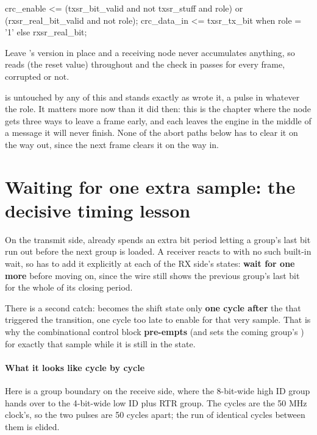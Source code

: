 \begin{vhdlcode}
crc_enable  <= (txsr_bit_valid and not txsr_stuff and role) or
               (rxsr_real_bit_valid and not role);
crc_data_in <= txsr_tx_bit when role = '1' else rxsr_real_bit;
\end{vhdlcode}

Leave 's version in place and a receiving node never accumulates anything, so
 reads  (the reset value) throughout and the check in
 passes for every frame, corrupted or not.

 is untouched by any of this and stands exactly as  wrote it, a pulse
in  whatever the role. It matters more now than it did then: this is the chapter
where the node gets three ways to leave a frame early, and each leaves the engine in the middle of a
message it will never finish. None of the abort paths below has to clear it on the way out, since the
next frame clears it on the way in.

\section{Waiting for one extra sample: the decisive timing lesson}
\label{c17:sec:preempt}

On the transmit side,  already spends an extra bit period letting a group's
last bit run out before the next group is loaded. A receiver reacts to  with
no such built-in wait, so  has to add it explicitly at each of the RX side's
 states: \textbf{wait for one more } before moving on, since the
wire still shows the previous group's last bit for the whole of its closing period.

There is a second catch:  becomes the shift state only \textbf{one cycle after} the
 that triggered the transition, one cycle too late to enable  for
that very sample. That is why the combinational control block \textbf{pre-empts} 
(and sets the coming group's ) for exactly that sample while it is still in the
 state.

\paragraph{What it looks like cycle by cycle}
Here is a group boundary on the receive side, where the 8-bit-wide high ID group hands over to the
4-bit-wide low ID plus RTR group. The cycles are the 50 MHz clock's, so the two 
pulses are 50 cycles apart; the run of identical cycles between them is elided.

